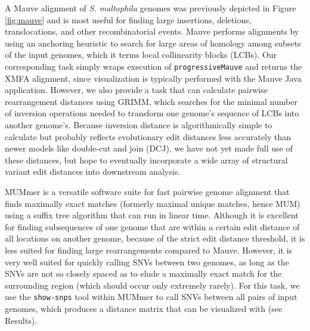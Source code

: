 A Mauve alignment of \emph{S. maltophila} genomes was previously depicted in Figure \ref{fig:mauve} and is most useful for finding large insertions, deletions, translocations, and other recombinatorial events. Mauve performs alignments by using an anchoring heuristic to search for large areas of homology among subsets of the input genomes, which it terms local collinearity blocks (LCBs).\autocite{Darling2010} Our corresponding task simply wraps execution of \texttt{progressiveMauve}\autocite{Darling2010} and returns the XMFA alignment, since visualization is typically performed with the Mauve Java application. However, we also provide a task that can calculate pairwise rearrangement distances using GRIMM,\autocite{Tesler2002} which searches for the minimal number of inversion operations needed to transform one genome's sequence of LCBs into another genome's. Because inversion distance is algorithmically simple to calculate\autocite{Hannenhalli1999} but probably reflects evolutionary edit distances less accurately than newer models like double-cut and join (DCJ),\autocite{Lin2008} we have not yet made full use of these distances, but hope to eventually incorporate a wide array of structural variant edit distances into downstream analysis.\autocite{Hilker2012}

MUMmer is a versatile software suite for fast pairwise genome alignment that finds maximally exact matches (formerly maximal unique matches, hence MUM) using a suffix tree algorithm that can run in linear time.\autocite{Kurtz2004} Although it is excellent for finding subsequences of one genome that are within a certain edit distance of all locations on another genome, because of the strict edit distance threshold, it is less suited for finding large rearrangements compared to Mauve. However, it is very well suited for quickly calling SNVs between two genomes, as long as the SNVs are not so closely spaced as to elude a maximally exact match for the surrounding region (which should occur only extremely rarely). For this task, we use the \texttt{show-snps} tool within MUMmer to call SNVs between all pairs of input genomes, which produces a distance matrix that can be visualized with \pathogendbviz{} (see Results).

